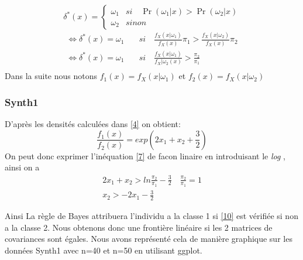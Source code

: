 \documentclass[10pt]{article}
\begin{document}
\[\delta^{*}(x) = \begin{cases} \omega_{1} & si  \quad \Pr(\omega_{1}|x)>  \Pr(\omega_{2}|x) \\
	\omega_{2} & sinon \end{cases}\]
\begin{equation}
\begin{split}
 \iff \delta^{*}(x) = \omega_{1} \quad & si \quad  \frac{f_{X}(x|\omega_{1})}{f_{X}(x)} \pi_{1}> \frac{f_{X}(x|\omega_{2})}{f_{X}(x)}\pi_{2} \\ 
\iff \delta^{*}(x) = \omega_{1} \quad & si \quad  \frac{f_{X}(x|\omega_{1})}{f_{X}|\omega_{2}(x)} > \frac{\pi_{2}}{\pi_{1}} \\ 
\end{split}
\label{9}
\end{equation}
 Dans la suite nous notons $f_1(x) = f_{X}(x|\omega_{1})$ et $f_2(x) = f_{X}(x|\omega_{2})$

\subsubsection{Synth1}
D'après les densités calculées dans \eqref{4} on obtient: \[\frac{f_{1}(x)}{f_{2}(x)} = exp(2x_{1} + x_{2} + \frac{3}{2})\]
On peut donc exprimer l'inéquation \ref{7} de facon linaire en introduisant le \textit{log} , ainsi on a
\begin{equation}
\begin{split}
2x_{1} + x_{2} > ln\frac{\pi_{2}}{\pi_{1}} - \frac{3}{2}   \quad \frac{\pi_{2}}{\pi_{1}} = 1 \\
x_{2} >  -2x_{1} - \frac{3}{2}
\label{10}
\end{split}
\end{equation}

Ainsi La règle de Bayes attribuera l'individu a la classe 1 si \eqref{10} est vérifiée si non a la classe 2. Nous obtenons donc une frontière linéaire si les 2 matrices de covariances sont égales. Nous avons représenté cela de manière graphique sur les données Synth1 avec n=40 et n=50 en utilisant ggplot.\\
\end{document}

